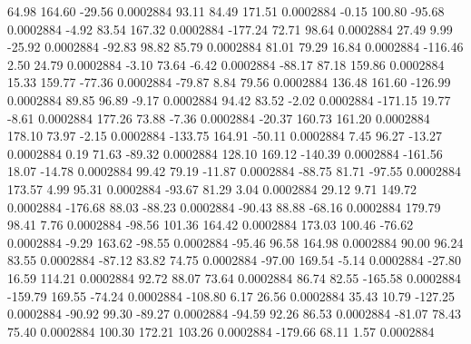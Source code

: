        64.98      164.60      -29.56     0.0002884
       93.11       84.49      171.51     0.0002884
       -0.15      100.80      -95.68     0.0002884
       -4.92       83.54      167.32     0.0002884
     -177.24       72.71       98.64     0.0002884
       27.49        9.99      -25.92     0.0002884
      -92.83       98.82       85.79     0.0002884
       81.01       79.29       16.84     0.0002884
     -116.46        2.50       24.79     0.0002884
       -3.10       73.64       -6.42     0.0002884
      -88.17       87.18      159.86     0.0002884
       15.33      159.77      -77.36     0.0002884
      -79.87        8.84       79.56     0.0002884
      136.48      161.60     -126.99     0.0002884
       89.85       96.89       -9.17     0.0002884
       94.42       83.52       -2.02     0.0002884
     -171.15       19.77       -8.61     0.0002884
      177.26       73.88       -7.36     0.0002884
      -20.37      160.73      161.20     0.0002884
      178.10       73.97       -2.15     0.0002884
     -133.75      164.91      -50.11     0.0002884
        7.45       96.27      -13.27     0.0002884
        0.19       71.63      -89.32     0.0002884
      128.10      169.12     -140.39     0.0002884
     -161.56       18.07      -14.78     0.0002884
       99.42       79.19      -11.87     0.0002884
      -88.75       81.71      -97.55     0.0002884
      173.57        4.99       95.31     0.0002884
      -93.67       81.29        3.04     0.0002884
       29.12        9.71      149.72     0.0002884
     -176.68       88.03      -88.23     0.0002884
      -90.43       88.88      -68.16     0.0002884
      179.79       98.41        7.76     0.0002884
      -98.56      101.36      164.42     0.0002884
      173.03      100.46      -76.62     0.0002884
       -9.29      163.62      -98.55     0.0002884
      -95.46       96.58      164.98     0.0002884
       90.00       96.24       83.55     0.0002884
      -87.12       83.82       74.75     0.0002884
      -97.00      169.54       -5.14     0.0002884
      -27.80       16.59      114.21     0.0002884
       92.72       88.07       73.64     0.0002884
       86.74       82.55     -165.58     0.0002884
     -159.79      169.55      -74.24     0.0002884
     -108.80        6.17       26.56     0.0002884
       35.43       10.79     -127.25     0.0002884
      -90.92       99.30      -89.27     0.0002884
      -94.59       92.26       86.53     0.0002884
      -81.07       78.43       75.40     0.0002884
      100.30      172.21      103.26     0.0002884
     -179.66       68.11        1.57     0.0002884
